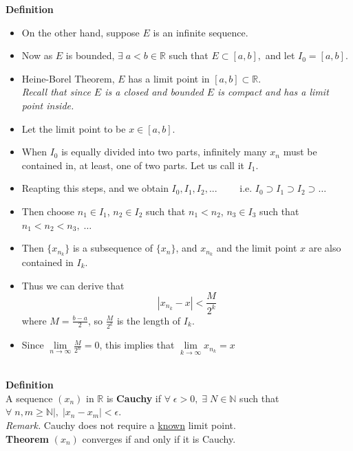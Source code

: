 \documentclass[12pt]{article}
\begin{document}
\begin{block}{\bf Definition}
\begin{itemize}
    \item On the other hand, suppose $E$ is an infinite sequence.
    \item Now as $E$ is bounded, $\exists\;a<b\in\mathbb{R}$ such that $E\subset[a,b],$ and let $I_0=[a,b]$.
    \item Heine-Borel Theorem, $E$ has a limit point in $[a,b]\subset\mathbb{R}.$\\
    {\sl Recall that since $E$ is a closed and bounded $E$ is compact and has a limit point inside.}
    \item Let the limit point to be $x \in[a,b].$\\
    
    
    \item When $I_0$ is equally divided into two parts, infinitely many $x_n$ must be contained in, at least, one of two parts. Let us call it $I_1$.
    \item Reapting this steps, and we obtain $I_0,I_1,I_2,...\qquad$ i.e. $I_0\supset I_1\supset I_2\supset \ldots$
    
    \item Then choose $n_1\in I_1$, $n_2\in I_2$ such that $n_1<n_2$, $n_3\in I_3$ such that $n_1<n_2<n_3,\;\ldots$
    \item Then $\{x_{n_k}\}$ is a subsequence of $\{x_n\}$, and $x_{n_k}$ and the limit point $x$ are also contained in $I_k$.
    \item Thus we can derive that 
    $$|x_{n_k}-x| < \frac{M}{2^k}$$
    where $M = \frac{b-a}{2}$, so $\frac{M}{2^k}$ is the length of $I_k$.
    \item Since $\lim\limits_{n\to\infty} \frac{M}{2^n} = 0$, this implies that $\lim\limits_{k\to\infty} x_{n_k} = x$
\end{itemize}\\

\vspace{1\baselineskip}
\textbf{Definition}\\
A sequence $(x_n)$ in $\mathbb{R}$ is \textbf{Cauchy} if $\forall\;\epsilon > 0,\; \exists \; N \in \mathbb{N}$ such that $\forall\;n,m \ge \mathbb{N}|,\; |x_n - x_m| < \epsilon$.\\

{\sl Remark.} Cauchy does not require a \underline{known} limit point.\\

\vspace{1\baselineskip}
\textbf{Theorem} $(x_n)$ converges if and only if it is Cauchy.\\


\end{block}
\end{document}
